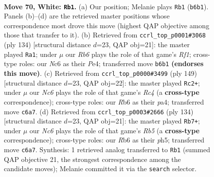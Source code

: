\documentclass[11pt]{article}
\begin{document}
\clearpage

\begin{figure}[p]\centering
\begin{subfigure}{0.46\textwidth}\centering
\resizebox{\linewidth}{!}{%
\newchessgame
\chessboard[
  setfen={8/6p1/1RN2pk1/7p/3P3P/6PK/3r4/8 w - - 33 70},
  showmover=false,
  pgfstyle=straightmove, color=movearrow, markmove={b6-b1}
]}
\caption{}
\end{subfigure}\hfill
\begin{subfigure}{0.46\textwidth}\centering
\resizebox{\linewidth}{!}{%
\newchessgame
\chessboard[
  setfen={8/5pk1/6p1/7p/4Pp1P/3r1P2/6PK/5R2 w - - 2 68},
  showmover=false,
  pgfstyle=straightmove, color=movearrow, markmove={f1-a1}
]}
\caption{}
\end{subfigure}
\\[4pt]
\begin{subfigure}{0.46\textwidth}\centering
\resizebox{\linewidth}{!}{%
\newchessgame
\chessboard[
  setfen={8/R7/6k1/p1r1p1p1/P6p/5P1P/5KP1/8 b - - 19 75},
  showmover=false,
  pgfstyle=straightmove, color=movearrow, markmove={c5-c2}
]}
\caption{}
\end{subfigure}\hfill
\begin{subfigure}{0.46\textwidth}\centering
\resizebox{\linewidth}{!}{%
\newchessgame
\chessboard[
  setfen={8/5k2/4p1p1/1R2P2p/5P1P/4r3/6PK/8 w - - 3 68},
  showmover=false,
  pgfstyle=straightmove, color=movearrow, markmove={b5-b7}
]}
\caption{}
\end{subfigure}
\caption{\textbf{Move 70, White: \texttt{Rb1}.} (a) Our position; Melanie plays \texttt{Rb1} (\texttt{b6b1}). Panels (b)--(d) are the retrieved master positions whose correspondence most drove this move (highest QAP objective among those that transfer to it). (b) Retrieved from \texttt{ccrl\_top\_p0001\#3068} (ply 134) [structural distance $d$=23, QAP obj=21]: the master played \texttt{Ra1}; under $\mu$ our \emph{Rb6} plays the role of that game's \emph{Rf1}; cross-type roles: our \emph{N}c6 as their \emph{P}e4; transferred move \texttt{b6b1} \textbf{(endorses this move)}. (c) Retrieved from \texttt{ccrl\_top\_p0000\#3499} (ply 149) [structural distance $d$=23, QAP obj=22]: the master played \texttt{Rc2+}; under $\mu$ our \emph{Nc6} plays the role of that game's \emph{Rc4} (a \textbf{cross-type} correspondence); cross-type roles: our \emph{R}b6 as their \emph{p}a4; transferred move \texttt{c6a7}. (d) Retrieved from \texttt{ccrl\_top\_p0003\#2666} (ply 134) [structural distance $d$=23, QAP obj=21]: the master played \texttt{Rb7+}; under $\mu$ our \emph{Nc6} plays the role of that game's \emph{Rb5} (a \textbf{cross-type} correspondence); cross-type roles: our \emph{R}b6 as their \emph{p}h5; transferred move \texttt{c6a7}. Synthesis: 1 retrieved analog transferred to \texttt{Rb1} (summed QAP objective 21, the strongest correspondence among the candidate moves); Melanie committed it via the \texttt{search} selector.}
\label{fig:thought-m138}
\end{figure}
\end{document}
